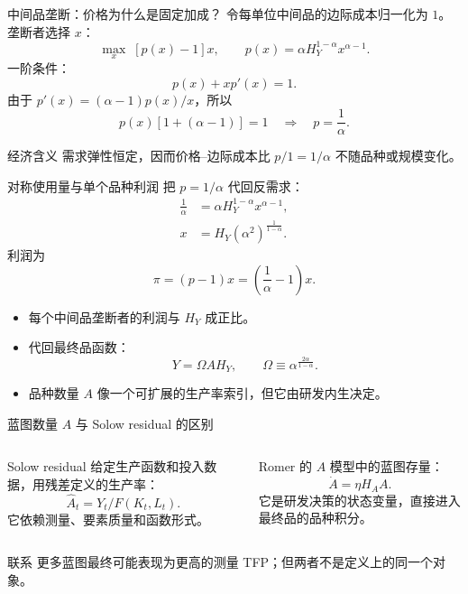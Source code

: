 \documentclass[aspectratio=32]{beamer}
\begin{document}
\begin{frame}{中间品垄断：价格为什么是固定加成？}
\small
令每单位中间品的边际成本归一化为 $1$。垄断者选择 $x$：
\[
  \max_x\;[p(x)-1]x,
  \qquad p(x)=\alpha H_Y^{1-\alpha}x^{\alpha-1}.
\]
一阶条件：
\[
  p(x)+x p'(x)=1.
\]
由于 $p'(x)=(\alpha-1)p(x)/x$，所以
\[
  p(x)[1+(\alpha-1)]=1
  \quad\Longrightarrow\quad
  \boxed{p=\frac{1}{\alpha}}.
\]
\begin{block}{经济含义}
需求弹性恒定，因而价格--边际成本比 $p/1=1/\alpha$ 不随品种或规模变化。
\end{block}
\end{frame}

\begin{frame}{对称使用量与单个品种利润}
\small
把 $p=1/\alpha$ 代回反需求：
\begin{align*}
  \frac{1}{\alpha}&=\alpha H_Y^{1-\alpha}x^{\alpha-1},\\
  x&=H_Y(\alpha^2)^{\frac{1}{1-\alpha}}.
\end{align*}
利润为
\[
  \pi=(p-1)x
  =\left(\frac{1}{\alpha}-1\right)x.
\]
\begin{itemize}
  \item 每个中间品垄断者的利润与 $H_Y$ 成正比。
  \item 代回最终品函数：
  \[
    Y=\Omega A H_Y,
    \qquad \Omega\equiv\alpha^{\frac{2\alpha}{1-\alpha}}.
  \]
  \item 品种数量 $A$ 像一个可扩展的生产率索引，但它由研发内生决定。
\end{itemize}
\end{frame}

\begin{frame}{蓝图数量 $A$ 与 Solow residual 的区别}
\small
\begin{columns}[T]
\begin{block}{Solow residual}
给定生产函数和投入数据，用残差定义的生产率：
\[
  \widehat A_t=Y_t/F(K_t,L_t).
\]
它依赖测量、要素质量和函数形式。
\end{block}
\begin{block}{Romer 的 $A$}
模型中的蓝图存量：
\[
  \dot A=\eta H_AA.
\]
它是研发决策的状态变量，直接进入最终品的品种积分。
\end{block}
\end{columns}
\vspace{0.2cm}
\begin{alertblock}{联系}
更多蓝图最终可能表现为更高的测量 TFP；但两者不是定义上的同一个对象。
\end{alertblock}
\end{frame}
\end{document}
